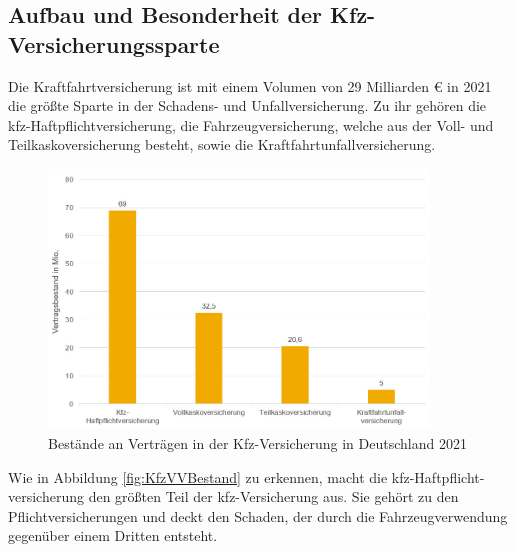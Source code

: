 
\subsection{Aufbau und Besonderheit der Kfz-Versicherungssparte}

Die Kraftfahrtversicherung ist mit einem Volumen von 29 Milliarden € in 2021 die größte Sparte in der Schadens- und Unfallversicherung.\autocite[Vgl.][]{GDVSUV} Zu ihr gehören die \ac{kfz}-Haftpflichtversicherung, die Fahrzeugversicherung, welche aus der Voll- und Teilkaskoversicherung besteht, sowie die Kraftfahrtunfallversicherung.\autocite[Vgl.][S. 8]{MURINGER2000}

\begin{figure}[h]
    \centering
    \includegraphics[width=0.9\textwidth]{img/KfzV_Bestände_an_Verträgen_2021.jpg}
    \caption[Bestände an Verträgen in der Kfz-Versicherung in Deutschland 2021]{Bestände an Verträgen in der Kfz-Versicherung in Deutschland 2021\autocite{KfzVVBestand}}
    \label{fig:KfzVVBestand}
\end{figure}


Wie in Abbildung \vref{fig:KfzVVBestand} zu erkennen, macht die \ac{kfz}-Haftpflicht- versicherung den größten Teil der \ac{kfz}-Versicherung aus. Sie gehört zu den Pflichtversicherungen und deckt den Schaden, der durch die Fahrzeugverwendung gegenüber einem Dritten entsteht. \autocite[Vgl.][S. 81]{STADLER2008}

